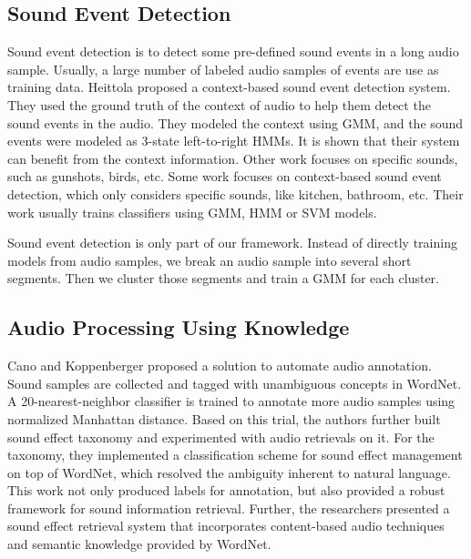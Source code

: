 \subsection{Sound Event Detection}
Sound event detection is to detect some pre-defined sound events in a long audio sample. Usually, a large number of labeled audio samples of events are use as training data.
Heittola \et\cite{Heittola2013EURASIP} proposed a context-based sound event detection system. They used the ground truth of the context of audio to help them detect the sound events in the audio. They modeled the context using GMM, and the sound events were modeled as 3-state left-to-right HMMs. It is shown that their system can benefit from the context information.
Other work focuses on specific sounds, such as gunshots\cite{1521669}, birds\cite{Fagerlund:2007:BSR:1288980.1289030}, etc. Some work focuses on context-based sound event detection, which only considers specific sounds, like kitchen\cite{Kraft05temporalica}, bathroom\cite{bathroom}, etc. Their work usually trains classifiers using GMM, HMM or SVM models.

Sound event detection is only part of our framework. Instead of directly training models from audio samples, we break an audio sample into several short segments. Then we cluster those segments and train a GMM for each cluster.

\subsection{Audio Processing Using Knowledge}

Cano and Koppenberger\cite{Cano2004:anno} proposed a solution to
automate audio annotation. Sound samples are collected and tagged
with unambiguous concepts in WordNet. A 20-nearest-neighbor classifier
is trained to annotate more audio samples using normalized Manhattan distance.
Based on this trial, the authors further built sound effect
taxonomy\cite{Cano2004:tax} and experimented with audio retrievals \cite{CanoKGHRW04}
on it. For the taxonomy\cite{Cano2004:tax}, they implemented a
classification scheme for sound effect management on top of WordNet,
which resolved the ambiguity inherent to natural language. This work not only
produced labels for annotation, but also provided a robust framework for
sound information retrieval. Further, the researchers presented a sound effect
retrieval system \cite{CanoKGHRW04} that incorporates content-based
audio techniques and semantic knowledge provided by WordNet.


